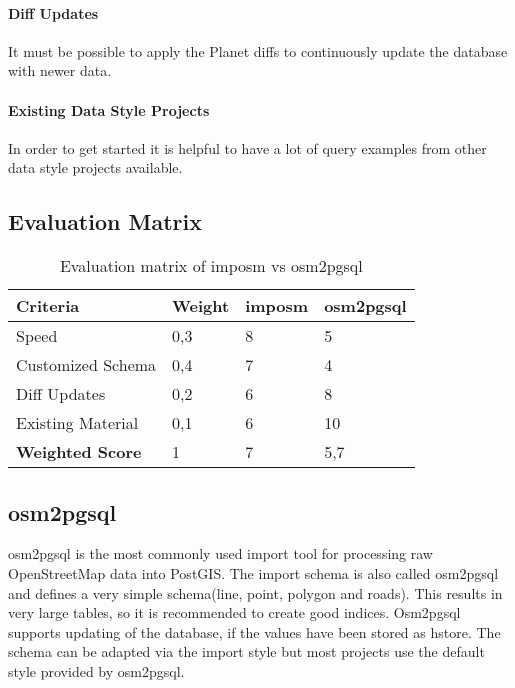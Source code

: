 \paragraph{Diff Updates}
It must be possible to apply the Planet diffs \cite{5_wiki.openstreetmap.org_2015}
to continuously update the database with newer data.

\paragraph{Existing Data Style Projects}
In order to get started it is helpful to have a lot of query examples
from other data style projects available.

\subsection{Evaluation Matrix}\label{evaluation_matrix}

\begin{table}[H]
\centering
    \begin{tabular}{llll}
    \hline
    Criteria         & Weight & imposm & osm2pgsql \\
    \hline
    Speed             & 0,3    & 8      & 5         \\
    Customized Schema & 0,4    & 7      & 4         \\
    Diff Updates      & 0,2    & 6      & 8         \\
    Existing Material & 0,1    & 6      & 10        \\
    \hline
    \textbf{Weighted Score} & 1      & 7      & 5,7       \\
    \end{tabular}
    \caption{Evaluation matrix of imposm vs osm2pgsql}
\end{table}


\subsection{osm2pgsql}\label{osm2pgsql_importer}

osm2pgsql\cite{4_wiki.openstreetmap.org_2015} is the
most commonly used import tool for processing raw OpenStreetMap data into PostGIS.
The import schema is also called osm2pgsql and defines a very
simple schema(line, point, polygon and
roads)\cite{6_wiki.openstreetmap.org_2015}.
This results in very large tables, so it is recommended to create good
indices. Osm2pgsql supports updating of the database, if the values have
been stored as hstore. The schema can be adapted via the import style \cite{7_wiki.openstreetmap.org_2015}
but most projects use the default style\cite{8_github_2015} provided by osm2pgsql.

